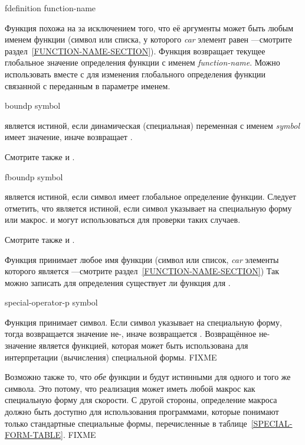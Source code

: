 \begin{defun}[Функция]
fdefinition function-name

Функция похожа на  
за исключением того, что её аргументы может быть любым именем функции (символ
или списка, у которого \emph{car} элемент равен ---смотрите раздел~\ref{FUNCTION-NAME-SECTION}).
Функция возвращает текущее глобальное значение определения функции с именем \emph{function-name}.
Можно использовать  вместе с 
для изменения глобального определения функции связанной с переданным в параметре
именем.
\end{defun}

\begin{defun}[Функция]
boundp symbol

 является истиной, если динамическая (специальная) переменная с
именем \emph{symbol} имеет значение, иначе возвращает {\false}.

Смотрите также  и .
\end{defun}

\begin{defun}[Функция]
fboundp symbol

 является истиной, если символ имеет глобальное определение
функции.
Следует отметить, что  является истиной, если символ указывает на
специальную форму или макрос.  и  могут
использоваться для проверки таких случаев.

Смотрите также  и .

Функция 
принимает любое имя функции (символ или список,
\emph{car} элементы которого является ---смотрите раздел~\ref{FUNCTION-NAME-SECTION})
Так можно записать  для определения существует ли
функция  для .
\end{defun}

\begin{defun}[Функция]
special-operator-p symbol

Функция  принимает символ. Если символ указывает на
специальную форму, тогда возвращается значение не-{\false}, иначе возвращается {\false}.
Возвращённое не-{\nil} значение является функцией,
которая может быть использована для интерпретации (вычисления) специальной
формы. FIXME

Возможно также то, что \emph{обе} функции  и
 будут истинными для одного и того же символа. Это потому,
что реализация может иметь любой макрос как специальную форму для скорости.
С другой стороны, определение макроса должно быть доступно для использования
программами, которые понимают только стандартные специальные формы,
перечисленные в таблице~\ref{SPECIAL-FORM-TABLE}. FIXME
\end{defun}

